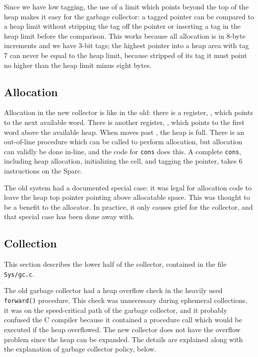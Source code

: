 Since we have low tagging, the use of a limit which points beyond the top of
the heap makes it easy for the garbage collector: a tagged pointer can be
compared to a heap limit without stripping the tag off the pointer or
inserting a tag in the heap limit before the comparison. This works because
all allocation is in 8-byte increments and we have 3-bit tags; the highest
pointer into a heap area with tag 7 can never be equal to the heap limit,
because stripped of its tag it must point no higher than the heap limit
minus eight bytes.

\subsection{Allocation}

Allocation in the new collector is like in the old: there is a register,
, which points to the next available word. There is another
register, , which points to the first word above the available
heap. When  moves past , the heap is full. There is an
out-of-line procedure which can be called to perform allocation, but
allocation can validly be done in-line, and the code for {\tt cons} does
this. A complete {\tt cons}, including heap allocation, initializing the
cell, and tagging the pointer, takes 6 instructions on the Sparc.

The old system had a documented special case: it was legal for allocation
code to leave the heap top pointer pointing above allocatable space. This
was thought to be a benefit to the allocator. In practice, it only causes
grief for the collector, and that special case has been done away with.

\subsection{Collection}

This section describes the lower half of the collector, contained in the
file {\tt Sys/gc.c}.

The old garbage collector had a heap overflow check in the heavily used {\tt
forward()} procedure. This check was unnecessary during ephemeral
collections, it was on the speed-critical path of the garbage collector, and
it probably confused the C compiler because it contained a procedure call
which would be executed if the heap overflowed. The new collector does not
have the overflow problem since the heap can be expanded.  The details are
explained along with the explanation of garbage collector policy, below.

